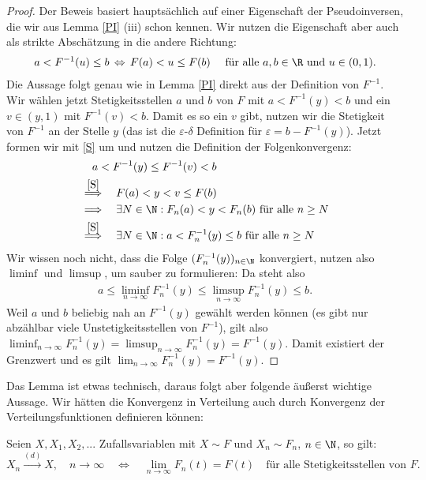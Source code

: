 \begin{proof}
	Der Beweis basiert haupts\"achlich auf einer Eigenschaft der Pseudoinversen, die wir aus Lemma \ref{PI} (iii) schon kennen. Wir nutzen die Eigenschaft aber auch als strikte Absch\"atzung in die andere Richtung:
	\begin{align}\label{S}
		a<F^{-1}(u)\leq b  \, \Leftrightarrow \,  F(a)<u\leq F(b)\quad \text{ f\"ur alle }a,b \in \R\text{ und }u \in (0,1).
	\end{align}
	Die Aussage folgt genau wie in Lemma \ref{PI} direkt aus der Definition von $F^{-1}$. Wir w\"ahlen jetzt Stetigkeitsstellen $a$ und $b$ von $F$ mit $a<F^{-1}(y)<b$ und ein $v\in (y,1)$ mit $F^{-1}(v)<b$. Damit es so ein $v$ gibt, nutzen wir die Stetigkeit von $F^{-1}$ an der Stelle $y$ (das ist die $\varepsilon$-$\delta$ Definition f\"ur $\varepsilon=b-F^{-1}(y)$). Jetzt formen wir mit \eqref{S} um und nutzen die Definition der Folgenkonvergenz:
	\begin{align*}
		&\quad a<F^{-1}(y)\leq F^{-1}(v)<b\\
		&\overset{\eqref{S}}{\Longrightarrow} \quad F(a)<y<v\leq F(b)\\
		&\Longrightarrow \quad \exists N\in\N: F_n(a)<y<F_n(b)\text{ f\"ur alle }n\geq N\\
		&\overset{\eqref{S}}{\Longrightarrow} \quad \exists N\in\N: a<F_n^{-1}(y)\leq b\text{ f\"ur alle }n\geq N
	\end{align*}
	Wir wissen noch nicht, dass die Folge $(F_n^{-1}(y))_{n\in\N}$ konvergiert, nutzen also $\liminf$ und $\limsup$, um sauber zu formulieren: Da steht also 
	\begin{align*}
		a\leq \liminf_{n\to\infty} F_n^{-1}(y) \leq \limsup_{n\to\infty} F_n^{-1}(y)\leq b.
	\end{align*}
	Weil $a$ und $b$ beliebig nah an $F^{-1}(y)$ gew\"ahlt werden k\"onnen (es gibt nur abz\"ahlbar viele Unstetigkeitsstellen von $F^{-1}$), gilt also $ \liminf_{n\to\infty} F_n^{-1}(y) = \limsup_{n\to\infty} F_n^{-1}(y) =F^{-1}(y)$. Damit existiert der Grenzwert und es gilt $\lim_{n\to\infty} F^{-1}_n(y)=F^{-1}(y)$.
	\end{proof}
Das Lemma ist etwas technisch, daraus folgt aber folgende \"au\ss erst wichtige Aussage. Wir h\"atten die Konvergenz in Verteilung auch durch Konvergenz der Verteilungsfunktionen definieren k\"onnen:
\begin{satz}\label{459}
	Seien $X, X_1,X_2,...$ Zufallsvariablen mit $X\sim F$ und $X_n\sim F_n$, $n\in\N$, so  gilt:
	\[ X_n \overset{{(d)}}{\longrightarrow} X, \quad n \to \infty \quad \Longleftrightarrow\quad \lim_{n\to\infty} F_n(t) =F(t)\quad \text{f\"ur alle Stetigkeitsstellen von }F. \]
\end{satz}

